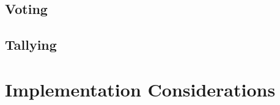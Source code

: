 \documentclass[runningheads,a4paper]{llncs}
\begin{document}
\subsection{Voting}

\subsection{Tallying}

\section{Implementation Considerations}





\end{document}
